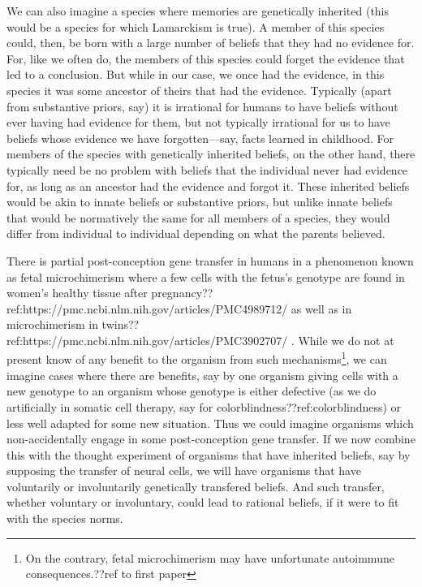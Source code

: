 We can also imagine a species where memories are genetically inherited (this would be a species for which
Lamarckism is true). A member of this species could, then, be born with a 
large number of beliefs that they had no evidence for. For, like we often do, the members of this species could forget the
evidence that led to a conclusion. But while in our case, we once had the evidence, in this species it was some ancestor
of theirs that had the evidence. Typically (apart from substantive priors, say) it is irrational for humans to have beliefs without ever having had evidence for them, but not typically irrational for us to have beliefs whose evidence
we have forgotten---say, facts learned in childhood. For members of the species with genetically inherited beliefs, on the other hand, there typically need be no problem with beliefs that the individual never had evidence for, as long as an ancestor had the evidence and forgot it. These inherited beliefs would be akin to innate beliefs or substantive priors, but unlike innate beliefs that would be normatively the same for all members of a species, they would differ from individual to individual
depending on what the parents believed. 

There is partial post-conception gene transfer in humans in a phenomenon known as fetal microchimerism where a few
cells with the fetus's genotype are found in women's healthy tissue after pregnancy??ref:https://pmc.ncbi.nlm.nih.gov/articles/PMC4989712/ as well as in microchimerism in twins??ref:https://pmc.ncbi.nlm.nih.gov/articles/PMC3902707/ . 
While we do not at present know of any benefit to the organism from such mechanisms\footnote{On the contrary,
fetal microchimerism may have unfortunate autoimmune consequences.??ref to first paper}, we can imagine cases where
there are benefits, say by one organism giving cells with a new genotype to an organism whose genotype is either
defective (as we do artificially in somatic cell therapy, say for colorblindness??ref:colorblindness) or less well
adapted for some new situation. Thus we could imagine organisms which non-accidentally engage in some post-conception gene transfer. If we now combine
this with the thought experiment of organisms that have inherited beliefs, say by supposing the transfer of neural
cells, we will have organisms that have voluntarily or involuntarily genetically transfered beliefs. And such 
transfer, whether voluntary or involuntary, could lead to rational beliefs, if it were to fit with the 
species norms.

